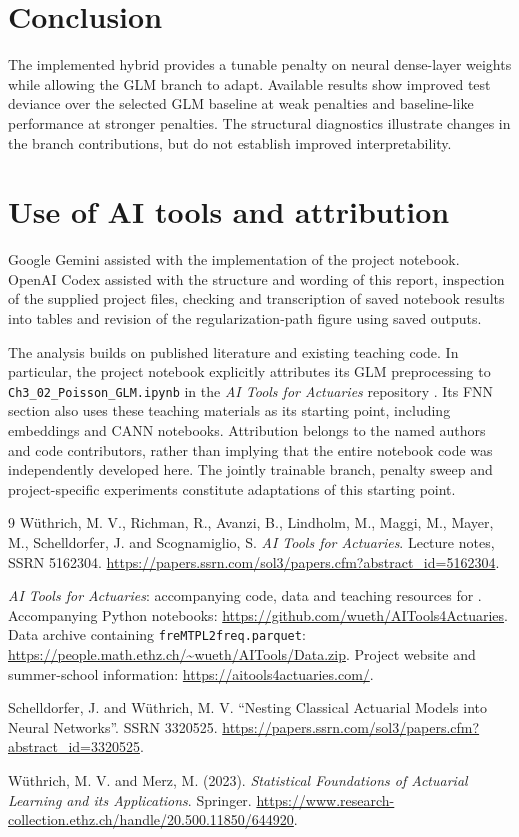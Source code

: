 \documentclass[a4paper]{article}
\begin{document}
\section{Conclusion}
The implemented hybrid provides a tunable penalty on neural dense-layer
weights while allowing the GLM branch to adapt.
Available results show improved test deviance over the selected GLM
baseline at weak penalties and baseline-like performance at stronger
penalties.
The structural diagnostics illustrate changes in the branch contributions,
but do not establish improved interpretability.

\section*{Use of AI tools and attribution}
Google Gemini assisted with the implementation of the project notebook.
OpenAI Codex assisted with the structure and wording of this report,
inspection of the supplied project files, checking and transcription of
saved notebook results into tables and revision of the regularization-path
figure using saved outputs.

The analysis builds on published literature and existing teaching code.
In particular, the project notebook explicitly attributes its GLM
preprocessing to \texttt{Ch3\_02\_Poisson\_GLM.ipynb} in the
\emph{AI Tools for Actuaries} repository \cite{resources}.
Its FNN section also uses these teaching materials as its starting
point, including embeddings and CANN notebooks.
Attribution belongs to the named authors and code contributors, rather
than implying that the entire notebook code was independently developed here.
The jointly trainable branch, penalty sweep and project-specific
experiments constitute adaptations of this starting point.


\begin{thebibliography}{9}
W\"uthrich, M. V., Richman, R., Avanzi, B., Lindholm, M., Maggi, M.,
Mayer, M., Schelldorfer, J. and Scognamiglio, S.
\emph{AI Tools for Actuaries}. Lecture notes, SSRN 5162304.
\url{https://papers.ssrn.com/sol3/papers.cfm?abstract_id=5162304}.

\emph{AI Tools for Actuaries}: accompanying code, data and teaching
resources for \cite{aitools}.
Accompanying Python notebooks:
\url{https://github.com/wueth/AITools4Actuaries}.
Data archive containing \texttt{freMTPL2freq.parquet}:
\url{https://people.math.ethz.ch/~wueth/AITools/Data.zip}.
Project website and summer-school information:
\url{https://aitools4actuaries.com/}.

Schelldorfer, J. and W\"uthrich, M. V.
``Nesting Classical Actuarial Models into Neural Networks''.
SSRN 3320525.
\url{https://papers.ssrn.com/sol3/papers.cfm?abstract_id=3320525}.


W\"uthrich, M. V. and Merz, M. (2023).
\emph{Statistical Foundations of Actuarial Learning and its Applications}.
Springer.
\url{https://www.research-collection.ethz.ch/handle/20.500.11850/644920}.


\end{thebibliography}
\end{document}
